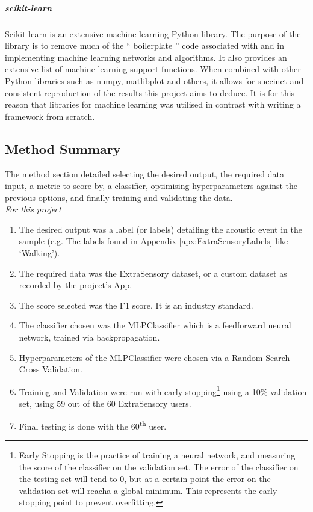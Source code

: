\documentclass{UoNMCHA}
\newcommand{\inlineQuote}[1]{`` #1 ''}
\newcommand{\aref}[1] {Appendix \ref{#1}}
\numberwithin{equation}{section}
\begin{document}
\subparagraph{scikit-learn}
Scikit-learn is an extensive machine learning Python library. The purpose of the library is to remove much of the \inlineQuote{boilerplate} code associated with and in implementing machine learning networks and algorithms. It also provides an extensive list of machine learning support functions.
When combined with other Python libraries such as numpy, matlibplot and others, it allows for succinct and consistent reproduction of the results this project aims to deduce. It is for this reason that libraries for machine learning was utilised in contrast with writing a framework from scratch.

\subsection{Method Summary}
The method section detailed selecting the desired output, the required data input, a metric to score by, a classifier, optimising hyperparameters against the previous options, and finally training and validating the data. \\

{\itshape For this project}
\begin{enumerate}
    \item The desired output was a label (or labels) detailing the acoustic event in the sample (e.g. The labels found in \aref{apx:ExtraSensoryLabels} like `Walking').
    \item The required data was the ExtraSensory dataset, or a custom dataset as recorded by the project's App.
    \item The score selected was the F1 score. It is an industry standard.
    \item The classifier chosen was the MLPClassifier which is a feedforward neural network, trained via backpropagation.
    \item Hyperparameters of the MLPClassifier were chosen via a Random Search Cross Validation.
    \item Training and Validation were run with early stopping\footnote{Early Stopping is the practice of training a neural network, and measuring the score of the classifier on the validation set. The error of the classifier on the testing set will tend to 0, but at a certain point the error on the validation set will reacha a global minimum. This represents the early stopping point to prevent overfitting.} using a 10\% validation set, using 59 out of the 60 ExtraSensory users.
    \item Final testing is done with the 60\textsuperscript{th} user.
\end{enumerate}
\end{document}
